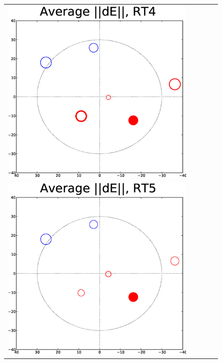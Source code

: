 \documentclass[]{aa}
\begin{document}
\begin{figure}
\begin{tabular}{@{}c@{}c@{}c@{}c@{}c@{}}
\includegraphics[width=\roguewidth]{o2006_dE_ant4} \\
\includegraphics[width=\roguewidth]{o2006_dE_ant5} &

\end{tabular}
\end{figure}
\end{document}
